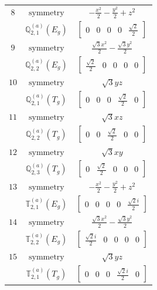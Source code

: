 \documentclass[fleqn,8pt,landscape]{jsarticle}
\begin{document}
\begin{longtable}{ccc}
$ 8 $ & $ \text{symmetry} $ & $ - \frac{x^{2}}{2} - \frac{y^{2}}{2} + z^{2} $ \\
$  $ & $ \mathbb{Q}_{2,1}^{(a)}(E_{g}) $ & $ \begin{bmatrix} 0 & 0 & 0 & 0 & \frac{\sqrt{2}}{2} \end{bmatrix} $ \\ \hline
$ 9 $ & $ \text{symmetry} $ & $ \frac{\sqrt{3} x^{2}}{2} - \frac{\sqrt{3} y^{2}}{2} $ \\
$  $ & $ \mathbb{Q}_{2,2}^{(a)}(E_{g}) $ & $ \begin{bmatrix} \frac{\sqrt{2}}{2} & 0 & 0 & 0 & 0 \end{bmatrix} $ \\ \hline
$ 10 $ & $ \text{symmetry} $ & $ \sqrt{3} y z $ \\
$  $ & $ \mathbb{Q}_{2,1}^{(a)}(T_{g}) $ & $ \begin{bmatrix} 0 & 0 & 0 & \frac{\sqrt{2}}{2} & 0 \end{bmatrix} $ \\ \hline
$ 11 $ & $ \text{symmetry} $ & $ \sqrt{3} x z $ \\
$  $ & $ \mathbb{Q}_{2,2}^{(a)}(T_{g}) $ & $ \begin{bmatrix} 0 & 0 & \frac{\sqrt{2}}{2} & 0 & 0 \end{bmatrix} $ \\ \hline
$ 12 $ & $ \text{symmetry} $ & $ \sqrt{3} x y $ \\
$  $ & $ \mathbb{Q}_{2,3}^{(a)}(T_{g}) $ & $ \begin{bmatrix} 0 & \frac{\sqrt{2}}{2} & 0 & 0 & 0 \end{bmatrix} $ \\ \hline
$ 13 $ & $ \text{symmetry} $ & $ - \frac{x^{2}}{2} - \frac{y^{2}}{2} + z^{2} $ \\
$  $ & $ \mathbb{T}_{2,1}^{(a)}(E_{g}) $ & $ \begin{bmatrix} 0 & 0 & 0 & 0 & \frac{\sqrt{2} i}{2} \end{bmatrix} $ \\ \hline
$ 14 $ & $ \text{symmetry} $ & $ \frac{\sqrt{3} x^{2}}{2} - \frac{\sqrt{3} y^{2}}{2} $ \\
$  $ & $ \mathbb{T}_{2,2}^{(a)}(E_{g}) $ & $ \begin{bmatrix} \frac{\sqrt{2} i}{2} & 0 & 0 & 0 & 0 \end{bmatrix} $ \\ \hline
$ 15 $ & $ \text{symmetry} $ & $ \sqrt{3} y z $ \\
$  $ & $ \mathbb{T}_{2,1}^{(a)}(T_{g}) $ & $ \begin{bmatrix} 0 & 0 & 0 & \frac{\sqrt{2} i}{2} & 0 \end{bmatrix} $ \\ \hline

\end{longtable}
\end{document}
